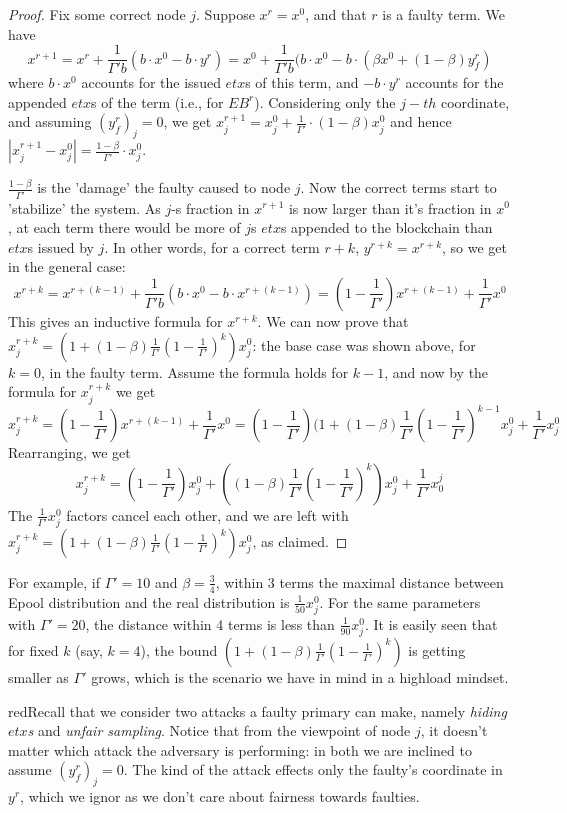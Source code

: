 \begin{proof} 
	Fix some correct node $j$. Suppose $x^r=x^0$, and that $r$ is a faulty term. We have 
    $$x^{r+1}=x^r+\frac{1}{\Gamma' b}(b\cdot x^0-b\cdot y^r)=x^0+\frac{1}{\Gamma' b}(b\cdot x^0-b\cdot(\beta x^0+(1-\beta) y^r_f)$$
    where $b\cdot x^0$ accounts for the issued $etx$s of this term, and $-b\cdot y^r$ accounts for the appended $etx$s of the term (i.e., for $EB^r$). Considering only the $j-th$ coordinate, and assuming $(y^r_f)_j=0$, we get $x^{r+1}_j=x^0_j+\frac{1}{\Gamma'}\cdot(1-\beta)x^0_j$ and hence $|x^{r+1}_j-x^0_j|=\frac{1-\beta}{\Gamma'}\cdot x^0_j$. 
    
    $\frac{1-\beta}{\Gamma'}$ is the 'damage' the faulty caused to node $j$. Now the correct terms start to 'stabilize' the system. As $j$-s fraction in $x^{r+1}$ is now larger than it's fraction in $x^0$, at each term there would be more of $j$s $etx$s appended to the blockchain than $etx$s issued by $j$. In other words, for a correct term $r+k$, $y^{r+k}=x^{r+k}$, so we get in the general case:
    $$x^{r+k}=x^{r+(k-1)}+\frac{1}{\Gamma' b}(b\cdot x^0-b\cdot x^{r+(k-1)})=(1-\frac{1}{\Gamma'})x^{r+(k-1)}+\frac{1}{\Gamma' }x^0$$
    This gives an inductive formula for $x^{r+k}$. We can now prove that $x^{r+k}_j=(1+(1-\beta)\frac{1}{\Gamma'}(1-\frac{1}{\Gamma'})^k)x^0_j$: the base case was shown above, for $k=0$, in the faulty term. Assume the formula holds for $k-1$, and now by the formula for $x^{r+k}_j$ we get
    $$x^{r+k}_j=(1-\frac{1}{\Gamma'})x^{r+(k-1)}+\frac{1}{\Gamma' }x^0=(1-\frac{1}{\Gamma'})(1+(1-\beta)\frac{1}{\Gamma'}(1-\frac{1}{\Gamma'})^{k-1}x^0_j+\frac{1}{\Gamma'}x^0_j$$
    Rearranging, we get
    $$x^{r+k}_j=(1-\frac{1}{\Gamma'})x^0_j+((1-\beta)\frac{1}{\Gamma'}(1-\frac{1}{\Gamma'})^k)x^0_j+\frac{1}{\Gamma'}x^j_0$$
    The $\frac{1}{\Gamma'}x^0_j$ factors cancel each other, and we are left with $x^{r+k}_j=(1+(1-\beta)\frac{1}{\Gamma'}(1-\frac{1}{\Gamma'})^k)x^0_j$, as claimed.
\end{proof}
For example, if $\Gamma'=10$ and $\beta=\frac{3}{4}$, within 3 terms the maximal distance between Epool distribution and the real distribution is $\frac{1}{50}x^0_j$. For the same parameters with $\Gamma'=20$, the distance within 4 terms is less than $\frac{1}{90}x^0_j$. It is easily seen that for fixed $k$ (say, $k=4$), the bound $(1+(1-\beta)\frac{1}{\Gamma'}(1-\frac{1}{\Gamma'})^k)$ is getting smaller as $\Gamma'$ grows, which is the scenario we have in mind in a highload mindset.

red{Recall that we consider two attacks a faulty primary can make, namely \textit{hiding $etx$s} and \textit{unfair sampling}. Notice that from the viewpoint of node $j$, it doesn't matter which attack the adversary is performing: in both we are inclined to assume $(y_f^r)_j=0$. The kind of the attack effects only the faulty's coordinate in $y^r$, which we ignor as we don't care about fairness towards faulties.}